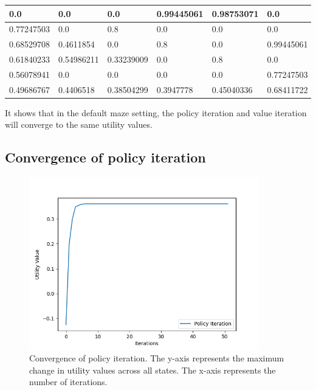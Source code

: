 \documentclass{article}
\begin{document}
\begin{table}[H]
    \begin{tabular}{|l|l|l|l|l|l|}
        \hline
        0.0        & 0.0        & 0.0        & 0.99445061 & 0.98753071 & 0.0        \\\hline
        0.77247503 & 0.0        & 0.8        & 0.0        & 0.0        & 0.0        \\\hline
        0.68529708 & 0.4611854  & 0.0        & 0.8        & 0.0        & 0.99445061 \\\hline
        0.61840233 & 0.54986211 & 0.33239009 & 0.0        & 0.8        & 0.0        \\\hline
        0.56078941 & 0.0        & 0.0        & 0.0        & 0.0        & 0.77247503 \\\hline
        0.49686767 & 0.4406518  & 0.38504299 & 0.3947778  & 0.45040336 & 0.68411722 \\\hline
    \end{tabular}
\end{table}

It shows that in the default maze setting, the policy iteration and value iteration will converge to the same utility values.

\subsection{Convergence of policy iteration}

\begin{figure}[H]
    \includegraphics[width=100mm]{../asset/policy_iteration_curve.png}
    \caption{Convergence of policy iteration. The y-axis represents the maximum change in utility values across all states. The x-axis represents the number of iterations.}
    \label{fig:policy_iteration_convergence}
\end{figure}
\end{document}
